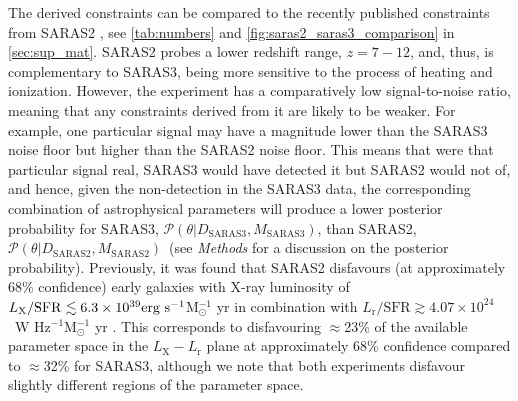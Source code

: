 The derived constraints can be compared to the recently published constraints from SARAS2 \citep[e.g. \cref{ch:saras2},][]{Bevins_SARAS2_2022}, see \cref{tab:numbers} and  \cref{fig:saras2_saras3_comparison} in \cref{sec:sup_mat}. SARAS2 probes a lower redshift range, $z = 7 -12$,  and, thus, is complementary to SARAS3, being more sensitive to the process of heating and ionization. However, the experiment has a comparatively low signal-to-noise ratio, meaning that any constraints derived from it are likely to be weaker. For example, one particular signal may have a magnitude lower than the SARAS3 noise floor but higher than the SARAS2 noise floor. This means that were that particular signal real, SARAS3 would have detected it but SARAS2 would not of, and hence, given the non-detection in the SARAS3 data, the corresponding combination of astrophysical parameters will produce a lower posterior probability for SARAS3, $\mathcal{P}(\theta|D_\mathrm{SARAS3}, M_\mathrm{SARAS3})$, than SARAS2, $\mathcal{P}(\theta|D_\mathrm{SARAS2}, M_\mathrm{SARAS2})$~(see \textit{Methods} for a discussion on the posterior probability). Previously, it was found that SARAS2 disfavours (at approximately 68\% confidence) early galaxies with X-ray luminosity of $L_\mathrm{X}/\mathrm{SFR} \lesssim 6.3\times10^{39}\textnormal{erg~s}^{-1}$M$_\odot^{-1}$ yr in combination with $L_\mathrm{r}/\mathrm{SFR} \gtrsim 4.07\times10^{24}$~W Hz$^{-1}$M$_\odot^{-1}$ yr \cite{Bevins_SARAS2_2022}. This corresponds to disfavouring $\approx$23\% of the available parameter space in the $L_\mathrm{X} - L_\mathrm{r}$ plane at approximately 68\% confidence compared to $\approx$32\% for SARAS3, although we note that both experiments disfavour slightly different regions of the parameter space. %

